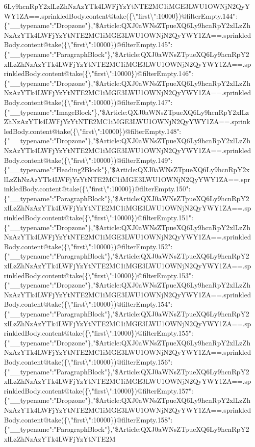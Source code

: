 6Ly9hcnRpY2xlLzZhNzAzYTk4LWFjYzYtNTE2MC1iMGE3LWU1OWNjN2QyYWY1ZA==.sprinkledBody.content@take(\{\textbackslash{}"first\textbackslash{}":10000\})@filterEmpty.144":\{"\_\_typename":"Dropzone"\},"\$Article:QXJ0aWNsZTpueXQ6Ly9hcnRpY2xlLzZhNzAzYTk4LWFjYzYtNTE2MC1iMGE3LWU1OWNjN2QyYWY1ZA==.sprinkledBody.content@take(\{\textbackslash{}"first\textbackslash{}":10000\})@filterEmpty.145":\{"\_\_typename":"ParagraphBlock"\},"\$Article:QXJ0aWNsZTpueXQ6Ly9hcnRpY2xlLzZhNzAzYTk4LWFjYzYtNTE2MC1iMGE3LWU1OWNjN2QyYWY1ZA==.sprinkledBody.content@take(\{\textbackslash{}"first\textbackslash{}":10000\})@filterEmpty.146":\{"\_\_typename":"Dropzone"\},"\$Article:QXJ0aWNsZTpueXQ6Ly9hcnRpY2xlLzZhNzAzYTk4LWFjYzYtNTE2MC1iMGE3LWU1OWNjN2QyYWY1ZA==.sprinkledBody.content@take(\{\textbackslash{}"first\textbackslash{}":10000\})@filterEmpty.147":\{"\_\_typename":"ImageBlock"\},"\$Article:QXJ0aWNsZTpueXQ6Ly9hcnRpY2xlLzZhNzAzYTk4LWFjYzYtNTE2MC1iMGE3LWU1OWNjN2QyYWY1ZA==.sprinkledBody.content@take(\{\textbackslash{}"first\textbackslash{}":10000\})@filterEmpty.148":\{"\_\_typename":"Dropzone"\},"\$Article:QXJ0aWNsZTpueXQ6Ly9hcnRpY2xlLzZhNzAzYTk4LWFjYzYtNTE2MC1iMGE3LWU1OWNjN2QyYWY1ZA==.sprinkledBody.content@take(\{\textbackslash{}"first\textbackslash{}":10000\})@filterEmpty.149":\{"\_\_typename":"Heading2Block"\},"\$Article:QXJ0aWNsZTpueXQ6Ly9hcnRpY2xlLzZhNzAzYTk4LWFjYzYtNTE2MC1iMGE3LWU1OWNjN2QyYWY1ZA==.sprinkledBody.content@take(\{\textbackslash{}"first\textbackslash{}":10000\})@filterEmpty.150":\{"\_\_typename":"ParagraphBlock"\},"\$Article:QXJ0aWNsZTpueXQ6Ly9hcnRpY2xlLzZhNzAzYTk4LWFjYzYtNTE2MC1iMGE3LWU1OWNjN2QyYWY1ZA==.sprinkledBody.content@take(\{\textbackslash{}"first\textbackslash{}":10000\})@filterEmpty.151":\{"\_\_typename":"Dropzone"\},"\$Article:QXJ0aWNsZTpueXQ6Ly9hcnRpY2xlLzZhNzAzYTk4LWFjYzYtNTE2MC1iMGE3LWU1OWNjN2QyYWY1ZA==.sprinkledBody.content@take(\{\textbackslash{}"first\textbackslash{}":10000\})@filterEmpty.152":\{"\_\_typename":"ParagraphBlock"\},"\$Article:QXJ0aWNsZTpueXQ6Ly9hcnRpY2xlLzZhNzAzYTk4LWFjYzYtNTE2MC1iMGE3LWU1OWNjN2QyYWY1ZA==.sprinkledBody.content@take(\{\textbackslash{}"first\textbackslash{}":10000\})@filterEmpty.153":\{"\_\_typename":"Dropzone"\},"\$Article:QXJ0aWNsZTpueXQ6Ly9hcnRpY2xlLzZhNzAzYTk4LWFjYzYtNTE2MC1iMGE3LWU1OWNjN2QyYWY1ZA==.sprinkledBody.content@take(\{\textbackslash{}"first\textbackslash{}":10000\})@filterEmpty.154":\{"\_\_typename":"ParagraphBlock"\},"\$Article:QXJ0aWNsZTpueXQ6Ly9hcnRpY2xlLzZhNzAzYTk4LWFjYzYtNTE2MC1iMGE3LWU1OWNjN2QyYWY1ZA==.sprinkledBody.content@take(\{\textbackslash{}"first\textbackslash{}":10000\})@filterEmpty.155":\{"\_\_typename":"Dropzone"\},"\$Article:QXJ0aWNsZTpueXQ6Ly9hcnRpY2xlLzZhNzAzYTk4LWFjYzYtNTE2MC1iMGE3LWU1OWNjN2QyYWY1ZA==.sprinkledBody.content@take(\{\textbackslash{}"first\textbackslash{}":10000\})@filterEmpty.156":\{"\_\_typename":"ParagraphBlock"\},"\$Article:QXJ0aWNsZTpueXQ6Ly9hcnRpY2xlLzZhNzAzYTk4LWFjYzYtNTE2MC1iMGE3LWU1OWNjN2QyYWY1ZA==.sprinkledBody.content@take(\{\textbackslash{}"first\textbackslash{}":10000\})@filterEmpty.157":\{"\_\_typename":"Dropzone"\},"\$Article:QXJ0aWNsZTpueXQ6Ly9hcnRpY2xlLzZhNzAzYTk4LWFjYzYtNTE2MC1iMGE3LWU1OWNjN2QyYWY1ZA==.sprinkledBody.content@take(\{\textbackslash{}"first\textbackslash{}":10000\})@filterEmpty.158":\{"\_\_typename":"ParagraphBlock"\},"\$Article:QXJ0aWNsZTpueXQ6Ly9hcnRpY2xlLzZhNzAzYTk4LWFjYzYtNTE2M